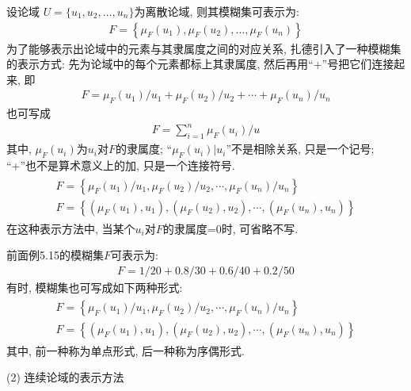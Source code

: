 设论域 $U=\{u_1, u_ 2, \ldots, u_n\}$为离散论域, 则其模糊集可表示为:
\begin{align}
  F=\left\{\mu_{F}\left(u_{1}\right), \mu_{F}\left(u_{2}\right), \ldots, \mu_{F}\left(u_{n}\right)\right\}
\end{align}
为了能够表示出论域中的元素与其隶属度之间的对应关系, 扎德引入了一种模糊集的表示方式: 先为论域中的每个元素都标上其隶属度, 然后再用“+”号把它们连接起来, 即
\begin{align}
  F=\mu_{F}\left(u_{1}\right) / u_{1}+\mu_{F}\left(u_{2}\right) / u_{2}+\cdots+\mu_{F}\left(u_{n}\right) / u_{n}
\end{align}
也可写成
\begin{align}
  F=\sum_{i=1}^{n} \mu_{F}\left(u_{i}\right) / u
\end{align}
其中, $\mu_{F}\left(u_{i}\right)$为$u_i$对$F$的隶属度; “$\mu_{F}\left(u_{i}\right) |u_{i}$”不是相除关系, 只是一个记号; “+”也不是算术意义上的加, 只是一个连接符号.
\begin{align}
\begin{array}{ll}
F=\left\{\mu_{F}\left(u_{1}\right) / u_{1}, \mu_{F}\left(u_{2}\right) / u_{2}, \cdots, \mu_{F}\left(u_{n}\right) / u_{n}\right\} \\
F=\left\{\left(\mu_{F}\left(u_{1}\right), u_{1}\right),\left(\mu_{F}\left(u_{2}\right), u_{2}\right), \cdots,\left(\mu_{F}\left(u_{n}\right), u_{n}\right)\right\}
\end{array}
\end{align}
在这种表示方法中, 当某个$u_i$对$F$的隶属度=0时, 可省略不写.
\begin{example}
前面例5.15的模糊集$F$可表示为:
\begin{align}
  F=1 / 20+0.8 / 30+0.6 / 40+0.2 / 50
\end{align}
    有时, 模糊集也可写成如下两种形式:
\begin{align}
\begin{array}{l}
F=\left\{\mu_{F}\left(u_{1}\right) / u_{1}, \mu_{F}\left(u_{2}\right) / u_{2}, \cdots, \mu_{F}\left(u_{n}\right) / u_{n}\right\} \\
F=\left\{\left(\mu_{F}\left(u_{1}\right), u_{1}\right),\left(\mu_{F}\left(u_{2}\right), u_{2}\right), \cdots,\left(\mu_{F}\left(u_{n}\right), u_{n}\right)\right\}
\end{array}
\end{align}
其中, 前一种称为单点形式, 后一种称为序偶形式.
\end{example}

 (2) 连续论域的表示方法

